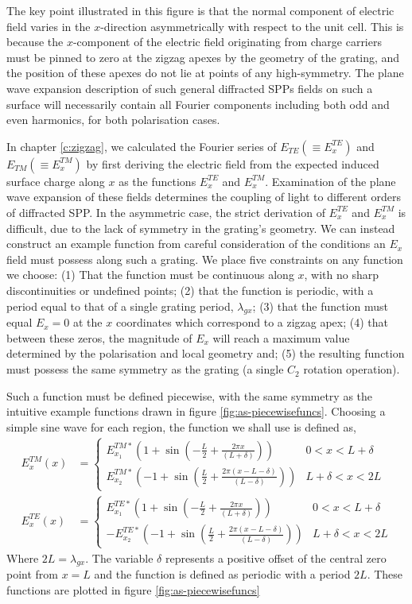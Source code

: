 The key point illustrated in this figure is that the normal component of electric field varies in the $x$-direction asymmetrically with respect to the unit cell. This is because the $x$-component of the electric field originating from charge carriers must be pinned to zero at the zigzag apexes by the geometry of the grating, and the position of these apexes do not lie at points of any high-symmetry. The plane wave expansion description of such general diffracted SPPs fields on such a surface will necessarily contain all Fourier components including both odd and even harmonics, for both polarisation cases. 

In chapter \ref{c:zigzag}, we calculated the Fourier series of $E_{TE} (\equiv E_x^{TE})$ and $E_{TM} (\equiv E_x^{TM})$ by first deriving the electric field from the expected induced surface charge along $x$ as the functions $E_x^{TE}$ and $E_x^{TM}$. Examination of the plane wave expansion of these fields determines the coupling of light to different orders of diffracted SPP. In the asymmetric case, the strict derivation of $E_x^{TE}$ and $E_x^{TM}$ is difficult, due to the lack of symmetry in the grating's geometry. 
We can instead construct an example function from careful consideration of the conditions an $E_x$ field must possess along such a grating. We place five constraints on any function we choose: (1) That the function must be continuous along $x$, with no sharp discontinuities or undefined points; (2) that the function is periodic, with a period equal to that of a single grating period, $\lambda_{gx}$; (3) that the function must equal $E_x=0$ at the $x$ coordinates which correspond to a zigzag apex; (4) that between these zeros, the magnitude of $E_x$ will reach a maximum value determined by the polarisation and local geometry and; (5) the resulting function must possess the same symmetry as the grating (a single $C_2$ rotation operation).

Such a function must be defined piecewise, with the same symmetry as the intuitive example functions drawn in figure \ref{fig:as-piecewisefuncs}. Choosing a simple sine wave for each region, the function we shall use is defined as,
\begin{align}
E_x^{TM}(x) &= \begin{cases} E_{x_1}^{TM*}(1+\sin{(-\frac{L}{2}+\frac{2\pi x}{(L+\delta)})}) &0<x<L+\delta \\
 E_{x_2}^{TM*}(-1+\sin{(\frac{L}{2}+\frac{2\pi (x-L-\delta)}{(L-\delta)})}) & L+\delta<x<2L \end{cases} 
\\
E_x^{TE}(x) &= \begin{cases} E_{x_1}^{TE*}(1+\sin{(-\frac{L}{2}+\frac{2\pi x}{(L+\delta)})}) &0<x<L+\delta \\
 -E_{x_2}^{TE*}(-1+\sin{(\frac{L}{2}+\frac{2\pi (x-L-\delta)}{(L-\delta)})})& L+\delta<x<2L \end{cases} 
\end{align} 
Where $2L=\lambda_{gx}$. The variable $\delta$ represents a positive offset of the central zero point from $x=L$ and the function is defined as periodic with a period $2L$. These functions are plotted in figure \ref{fig:as-piecewisefuncs}

